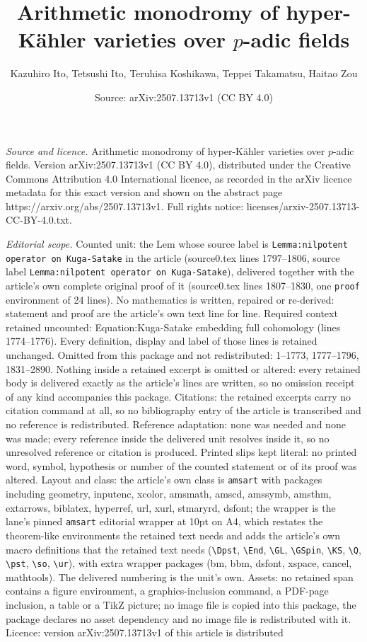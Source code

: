 \documentclass[10pt,a4paper]{amsart}
\title[Arithmetic monodromy of hyper-K\"ahler varieties over $p$-ad]{Arithmetic monodromy of hyper-K\"ahler varieties over $p$-adic fields}
\author{Kazuhiro Ito, Tetsushi Ito, Teruhisa Koshikawa, Teppei Takamatsu, Haitao Zou}
\date{Source: arXiv:2507.13713v1 (CC BY 4.0)}
\begin{document}
\maketitle

\noindent\emph{Source and licence.} Arithmetic monodromy of hyper-K\"ahler varieties over $p$-adic fields. Version arXiv:2507.13713v1 (CC BY 4.0), distributed under the Creative Commons Attribution 4.0 International licence, as recorded in the arXiv licence metadata for this exact version and shown on the abstract page https://arxiv.org/abs/2507.13713v1. Full rights notice: licenses/arxiv-2507.13713-CC-BY-4.0.txt.\par\smallskip

\noindent\textit{Editorial scope.} Counted unit: the Lem whose source label is \texttt{Lemma:nilpotent operator on Kuga-Satake} in the article (source0.tex lines 1797--1806, source label \texttt{Lemma:nilpotent operator on Kuga-Satake}), delivered together with the article's own complete original proof of it (source0.tex lines 1807--1830, one \texttt{proof} environment of 24 lines). No mathematics is written, repaired or re-derived: statement and proof are the article's own text line for line. Required context retained uncounted: Equation:Kuga-Satake embedding full cohomology (lines 1774--1776). Every definition, display and label of those lines is retained unchanged. Omitted from this package and not redistributed: 1--1773, 1777--1796, 1831--2890. Nothing inside a retained excerpt is omitted or altered: every retained body is delivered exactly as the article's lines are written, so no omission receipt of any kind accompanies this package. Citations: the retained excerpts carry no citation command at all, so no bibliography entry of the article is transcribed and no reference is redistributed. Reference adaptation: none was needed and none was made; every reference inside the delivered unit resolves inside it, so no unresolved reference or citation is produced. Printed slips kept literal: no printed word, symbol, hypothesis or number of the counted statement or of its proof was altered. Layout and class: the article's own class is \texttt{amsart} with packages including geometry, inputenc, xcolor, amsmath, amscd, amssymb, amsthm, extarrows, biblatex, hyperref, url, xurl, stmaryrd, dsfont; the wrapper is the lane's pinned \texttt{amsart} editorial wrapper at 10pt on A4, which restates the theorem-like environments the retained text needs and adds the article's own macro definitions that the retained text needs (\texttt{\textbackslash Dpst}, \texttt{\textbackslash End}, \texttt{\textbackslash GL}, \texttt{\textbackslash GSpin}, \texttt{\textbackslash KS}, \texttt{\textbackslash Q}, \texttt{\textbackslash pst}, \texttt{\textbackslash so}, \texttt{\textbackslash ur}), with extra wrapper packages (bm, bbm, dsfont, xspace, cancel, mathtools). The delivered numbering is the unit's own. Assets: no retained span contains a figure environment, a graphics-inclusion command, a PDF-page inclusion, a table or a TikZ picture; no image file is copied into this package, the package declares no asset dependency and no image file is redistributed with it. Licence: version arXiv:2507.13713v1 of this article is distributed 
\end{document}
